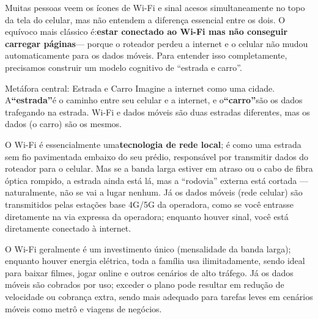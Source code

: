 


Muitas pessoas veem os ícones de Wi-Fi e sinal acesos simultaneamente no topo da tela do celular, mas não entendem a diferença essencial entre os dois. O equívoco mais clássico é:\textbf{estar conectado ao Wi-Fi mas não conseguir carregar páginas}— porque o roteador perdeu a internet e o celular não mudou automaticamente para os dados móveis. Para entender isso completamente, precisamos construir um modelo cognitivo de “estrada e carro”.

\begin{tcbinfo}{Metáfora central: Estrada e Carro}
Imagine a internet como uma cidade. A\textbf{“estrada”}é o caminho entre seu celular e a internet, e o\textbf{“carro”}são os dados trafegando na estrada. Wi-Fi e dados móveis são duas estradas diferentes, mas os dados (o carro) são os mesmos.

\end{tcbinfo}


O Wi-Fi é essencialmente uma\textbf{tecnologia de rede local}; é como uma estrada sem fio pavimentada embaixo do seu prédio, responsável por transmitir dados do roteador para o celular. Mas se a banda larga estiver em atraso ou o cabo de fibra óptica rompido, a estrada ainda está lá, mas a “rodovia” externa está cortada — naturalmente, não se vai a lugar nenhum. Já os dados móveis (rede celular) são transmitidos pelas estações base 4G/5G da operadora, como se você entrasse diretamente na via expressa da operadora; enquanto houver sinal, você está diretamente conectado à internet.


O Wi-Fi geralmente é um investimento único (mensalidade da banda larga); enquanto houver energia elétrica, toda a família usa ilimitadamente, sendo ideal para baixar filmes, jogar online e outros cenários de alto tráfego. Já os dados móveis são cobrados por uso; exceder o plano pode resultar em redução de velocidade ou cobrança extra, sendo mais adequado para tarefas leves em cenários móveis como metrô e viagens de negócios.

